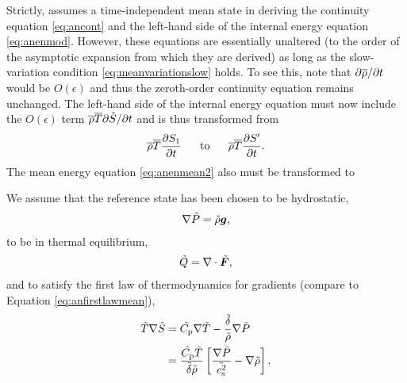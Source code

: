 \documentclass[12pt]{article}
\newcommand{\vecf}{\bm{F}}
\begin{document}
Strictly, \citet{Gough1969} assumes a time-independent mean state in deriving the continuity equation \eqref{eq:ancont} and the left-hand side of the internal energy equation \eqref{eq:anenmod}. However, these equations are essentially unaltered (to the order of the asymptotic expansion from which they are derived) as long as the slow-variation condition \eqref{eq:meanvariationslow} holds. To see this, note that $\partial\overline{\rho}/\partial t$ would be $O(\epsilon)$ and thus the zeroth-order continuity equation remains unchanged. The left-hand side of the internal energy equation must now include the $O(\epsilon)$ term $\overline{\rho}\overline{T} \partial\hat{S}/\partial t$ and is thus transformed from
\begin{align}\label{eq:anenmodlhs}
	\overline{\rho}\overline{T}\frac{\partial S_1}{\partial t}\ \ \ \ \ \text{to}\ \ \ \ \   \overline{\rho}\overline{T}\frac{\partial S^\prime}{\partial t}.
\end{align}
The mean energy equation \eqref{eq:anenmean2} also must be transformed to

We assume that the reference state has been chosen to be hydrostatic,
\begin{align}\label{eq:refhydro}
	\nabla \tilde{P} = \tilde{\rho}\bm{g},
\end{align}
to be in thermal equilibrium,
\begin{align}\label{eq:refthermalequil}
	\tilde{Q} = \Div\tilde{\vecf},
\end{align}
and to satisfy the first law of thermodynamics for gradients (compare to Equation \eqref{eq:anfirstlawmean}),
\begin{subequations}\label{eq:anfirstlawref}
	\begin{align}
		\tilde{T}\nabla\tilde{S} &= \tilde{C_{\rm{p}}}\nabla\tilde{T} - \frac{\tilde{\delta} }{\tilde{\rho}}\nabla\tilde{P} \\
		&= \frac{\tilde{C_{\rm{p}}}\tilde{T}}{\tilde{\delta} \tilde{\rho}}\left[\frac{\nabla\tilde{P}}{\tilde{c_{\rm s}^2}}-\nabla\tilde{\rho}\right].
	\end{align}
\end{subequations}
\end{document}
